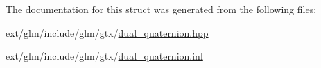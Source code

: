 The documentation for this struct was generated from the following files\-:\begin{DoxyCompactItemize}
\item 
ext/glm/include/glm/gtx/\hyperlink{dual__quaternion_8hpp}{dual\-\_\-quaternion.\-hpp}\item 
ext/glm/include/glm/gtx/\hyperlink{dual__quaternion_8inl}{dual\-\_\-quaternion.\-inl}\end{DoxyCompactItemize}
